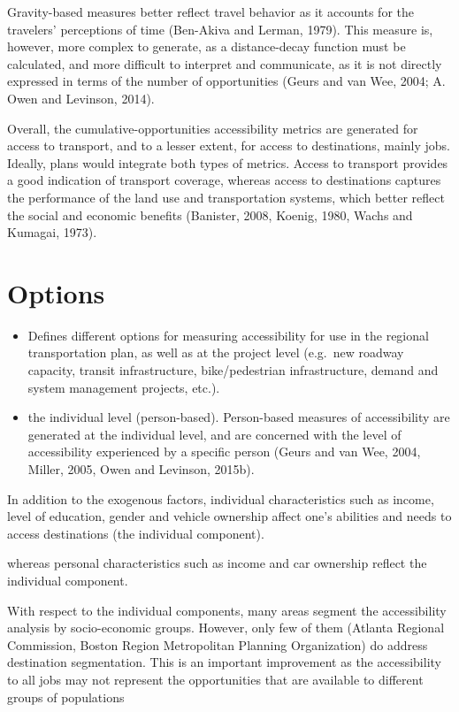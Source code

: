 \documentclass[12pt,]{article}
\begin{document}
Gravity-based measures better reflect travel behavior as it accounts for
the travelers' perceptions of time (Ben-Akiva and Lerman, 1979). This
measure is, however, more complex to generate, as a distance-decay
function must be calculated, and more difficult to interpret and
communicate, as it is not directly expressed in terms of the number of
opportunities (Geurs and van Wee, 2004; A. Owen and Levinson, 2014).

Overall, the cumulative-opportunities accessibility metrics are
generated for access to transport, and to a lesser extent, for access to
destinations, mainly jobs. Ideally, plans would integrate both types of
metrics. Access to transport provides a good indication of transport
coverage, whereas access to destinations captures the performance of the
land use and transportation systems, which better reflect the social and
economic benefits (Banister, 2008, Koenig, 1980, Wachs and Kumagai,
1973).

\hypertarget{options}{%
\section{Options}\label{options}}

\begin{itemize}
\item
  Defines different options for measuring accessibility for use in the
  regional transportation plan, as well as at the project level
  (e.g.~new roadway capacity, transit infrastructure, bike/pedestrian
  infrastructure, demand and system management projects, etc.).
\item
  the individual level (person-based). Person-based measures of
  accessibility are generated at the individual level, and are concerned
  with the level of accessibility experienced by a specific person
  (Geurs and van Wee, 2004, Miller, 2005, Owen and Levinson, 2015b).
\end{itemize}

In addition to the exogenous factors, individual characteristics such as
income, level of education, gender and vehicle ownership affect one's
abilities and needs to access destinations (the individual component).

whereas personal characteristics such as income and car ownership
reflect the individual component.

With respect to the individual components, many areas segment the
accessibility analysis by socio-economic groups. However, only few of
them (Atlanta Regional Commission, Boston Region Metropolitan Planning
Organization) do address destination segmentation. This is an important
improvement as the accessibility to all jobs may not represent the
opportunities that are available to different groups of populations
\end{document}
